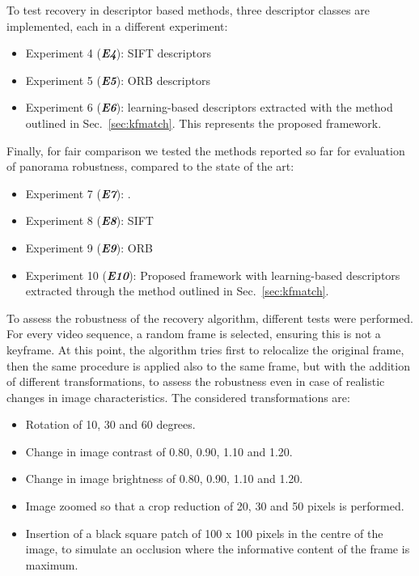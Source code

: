 \documentclass[sn-basic]{sn-jnl}%
\begin{document}
To test recovery in descriptor based methods, three descriptor classes are implemented, each in a different experiment:
\begin{itemize}
    \item Experiment 4 (\textit{\textbf{E4}}): SIFT descriptors
    \item Experiment 5 (\textit{\textbf{E5}}): ORB descriptors
    \item Experiment 6 (\textit{\textbf{E6}}): learning-based descriptors extracted with the method outlined in Sec.~\ref{sec:kfmatch}. This represents the proposed framework.
\end{itemize}


Finally, for fair comparison we tested the methods reported so far for evaluation of panorama robustness, compared to the state of the art:

\begin{itemize}
    \item Experiment 7 (\textit{\textbf{E7}}): \cite{BanoMosaicking2020}.
    \item Experiment 8 (\textit{\textbf{E8}}): SIFT 
    \item Experiment 9 (\textit{\textbf{E9}}): ORB
    \item Experiment 10 (\textit{\textbf{E10}}): Proposed framework with learning-based descriptors extracted through the method outlined in Sec.~\ref{sec:kfmatch}. 
\end{itemize}

To assess the robustness of the recovery algorithm, different tests were performed. For every video sequence, a random frame is selected, ensuring this is not a keyframe. At this point, the algorithm tries first to relocalize the original frame, then the same procedure is applied also to the same frame, but with the addition of different transformations, to assess the robustness even in case of realistic changes in image characteristics. The considered transformations are:

\begin{itemize}
    \item Rotation of 10, 30 and 60 degrees.
    \item Change in image contrast of 0.80, 0.90, 1.10 and 1.20.
    \item Change in image brightness of 0.80, 0.90, 1.10 and 1.20.
    \item Image zoomed so that a crop reduction of 20, 30 and 50 pixels is performed. 
    \item Insertion of a black square patch of 100 x 100 pixels in the centre of the image, to simulate an occlusion where the informative content of the frame is maximum. 
\end{itemize}
\end{document}
